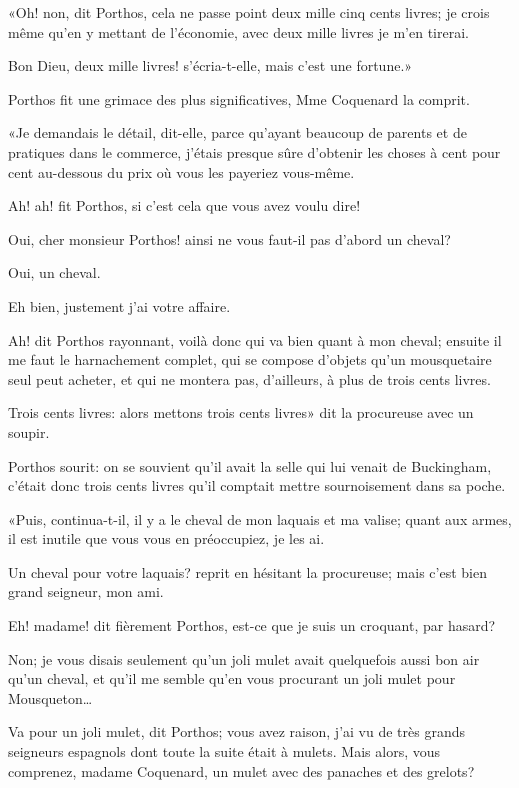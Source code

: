 «Oh! non, dit Porthos, cela ne passe point deux mille cinq cents livres; je crois même qu'en y mettant de l'économie, avec deux mille livres je m'en tirerai. 

\speak  Bon Dieu, deux mille livres! s'écria-t-elle, mais c'est une fortune.» 

Porthos fit une grimace des plus significatives, Mme Coquenard la comprit. 

«Je demandais le détail, dit-elle, parce qu'ayant beaucoup de parents et de pratiques dans le commerce, j'étais presque sûre d'obtenir les choses à cent pour cent au-dessous du prix où vous les payeriez vous-même. 

\speak  Ah! ah! fit Porthos, si c'est cela que vous avez voulu dire! 

\speak  Oui, cher monsieur Porthos! ainsi ne vous faut-il pas d'abord un cheval? 

\speak  Oui, un cheval. 

\speak  Eh bien, justement j'ai votre affaire. 

\speak  Ah! dit Porthos rayonnant, voilà donc qui va bien quant à mon cheval; ensuite il me faut le harnachement complet, qui se compose d'objets qu'un mousquetaire seul peut acheter, et qui ne montera pas, d'ailleurs, à plus de trois cents livres. 

\speak  Trois cents livres: alors mettons trois cents livres» dit la procureuse avec un soupir. 

Porthos sourit: on se souvient qu'il avait la selle qui lui venait de Buckingham, c'était donc trois cents livres qu'il comptait mettre sournoisement dans sa poche. 

«Puis, continua-t-il, il y a le cheval de mon laquais et ma valise; quant aux armes, il est inutile que vous vous en préoccupiez, je les ai. 

\speak  Un cheval pour votre laquais? reprit en hésitant la procureuse; mais c'est bien grand seigneur, mon ami. 

\speak  Eh! madame! dit fièrement Porthos, est-ce que je suis un croquant, par hasard? 

\speak  Non; je vous disais seulement qu'un joli mulet avait quelquefois aussi bon air qu'un cheval, et qu'il me semble qu'en vous procurant un joli mulet pour Mousqueton\dots 

\speak  Va pour un joli mulet, dit Porthos; vous avez raison, j'ai vu de très grands seigneurs espagnols dont toute la suite était à mulets. Mais alors, vous comprenez, madame Coquenard, un mulet avec des panaches et des grelots? 

